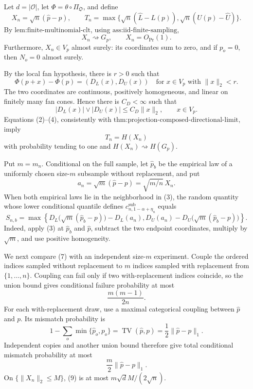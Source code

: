 Let \(d=|\mathcal O|\), let \(\Phi=\theta\circ\Pi_{\mathfrak O}\), and define
\[
X_n=\sqrt n(\widehat p-p),
\qquad
T_n=\max\{\sqrt n(\widehat L-L(p)),\sqrt n(U(p)-\widehat U)\}.
\tag{1}
\]
By \(\text{lem:finite-multinomial-clt}\), using \(\text{ass:iid-finite-sampling}\),
\[
X_n\rightsquigarrow G_p,
\qquad X_n=O_{\Pr}(1).
\tag{2}
\]
Furthermore, \(X_n\in V_p\) almost surely: its coordinates sum to zero, and if \(p_o=0\), then \(N_o=0\) almost surely.

By the local fan hypothesis, there is \(r>0\) such that
\[
\Phi(p+x)-\Phi(p)=(D_L(x),D_U(x))
\quad\text{for }x\in V_p\text{ with }\|x\|_2<r.
\tag{3}
\]
The two coordinates are continuous, positively homogeneous, and linear on finitely many fan cones.  Hence there is \(C_D<\infty\) such that
\[
|D_L(x)|\vee|D_U(x)|\leq C_D\|x\|_2,
\qquad x\in V_p.
\tag{4}
\]
Equations (2)--(4), consistently with \(\text{thm:projection-composed-directional-limit}\), imply
\[
T_n=H(X_n)
\tag{5}
\]
with probability tending to one and \(H(X_n)\rightsquigarrow H(G_p)\).

Put \(m=m_n\).  Conditional on the full sample, let \(\widehat p_b\) be the empirical law of a uniformly chosen size-\(m\) subsample without replacement, and put
\[
a_n=\sqrt m(\widehat p-p)=\sqrt{m/n}\,X_n.
\tag{6}
\]
When both empirical laws lie in the neighborhood in (3), the random quantity whose lower conditional quantile defines \(c^{\mathrm{sub}}_{n,1-\alpha+\eta_n}\) equals
\[
S_{n,b}=\max\left\{
D_L\bigl(\sqrt m(\widehat p_b-p)\bigr)-D_L(a_n),
D_U(a_n)-D_U\bigl(\sqrt m(\widehat p_b-p)\bigr)
\right\}.
\tag{7}
\]
Indeed, apply (3) at \(\widehat p_b\) and \(\widehat p\), subtract the two endpoint coordinates, multiply by \(\sqrt m\), and use positive homogeneity.

We next compare (7) with an independent size-\(m\) experiment.  Couple the ordered indices sampled without replacement to \(m\) indices sampled with replacement from \(\{1,\ldots,n\}\).  Coupling can fail only if two with-replacement indices coincide, so the union bound gives conditional failure probability at most
\[
\frac{m(m-1)}{2n}.
\tag{8}
\]
For each with-replacement draw, use a maximal categorical coupling between \(\widehat p\) and \(p\).  Its mismatch probability is
\[
1-\sum_o\min\{\widehat p_o,p_o\}
=\operatorname{TV}(\widehat p,p)
=\frac12\|\widehat p-p\|_1.
\]
Independent copies and another union bound therefore give total conditional mismatch probability at most
\[
\frac m2\|\widehat p-p\|_1.
\tag{9}
\]
On \(\{\|X_n\|_2\leq M\}\), (9) is at most \(m\sqrt d M/(2\sqrt n)\).


